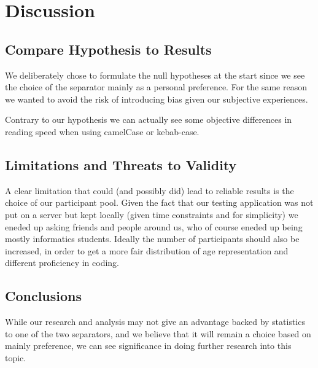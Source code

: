 \documentclass{article}
\begin{document}
\section{Discussion}

\subsection{Compare Hypothesis to Results}
We deliberately chose to formulate the null hypotheses at the start since we see the choice of the separator mainly as a personal preference. For the same reason 
we wanted to avoid the risk of introducing bias given our subjective experiences.

Contrary to our hypothesis we can actually see some objective differences in reading speed when using camelCase or kebab-case.

\subsection{Limitations and Threats to Validity}
A clear limitation that could (and possibly did) lead to reliable results is the choice of our participant pool. Given the fact that our testing application 
was not put on a server but kept locally (given time constraints and for simplicity) we eneded up asking friends and people around us, who of course eneded up being 
mostly informatics students. Ideally the number of participants should also be increased, in order to get a more fair distribution of age representation and different 
proficiency in coding.

\subsection{Conclusions}
While our research and analysis may not give an advantage backed by statistics to one of the two separators, and we believe that it will remain a choice based on mainly 
preference, we can see significance in doing further research into this topic.
\end{document}
